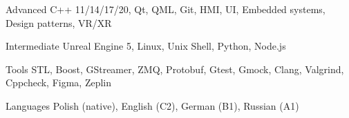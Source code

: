 

\begin{cvskills}

  \cvskill
    {Advanced} %
    {C++ 11/14/17/20, Qt, QML, Git, HMI, UI, Embedded systems, Design patterns, VR/XR} %

  \cvskill
    {Intermediate} %
    {Unreal Engine 5, Linux, Unix Shell, Python, Node.js} %

  \cvskill
    {Tools} %
    {STL, Boost, GStreamer, ZMQ, Protobuf, Gtest, Gmock, Clang, Valgrind, Cppcheck, Figma, Zeplin} %

  \cvskill
    {Languages} %
    {Polish (native), English (C2), German (B1), Russian (A1)} %

\end{cvskills}
